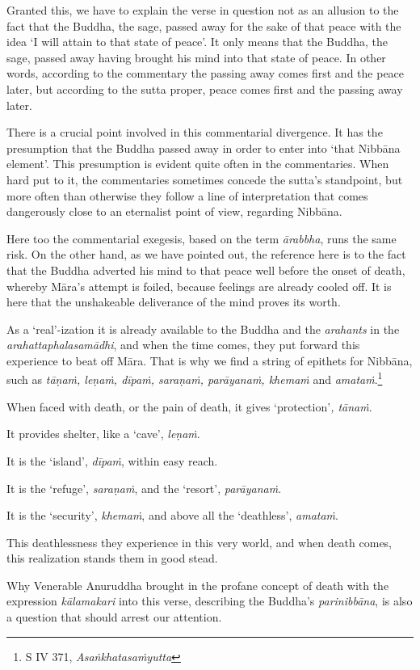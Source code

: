Granted this, we have to explain the verse in question not as an allusion to the fact that the Buddha, the sage, passed away for the sake of that peace with the idea `I will attain to that state of peace'. It only means that the Buddha, the sage, passed away having brought his mind into that state of peace. In other words, according to the commentary the passing away comes first and the peace later, but according to the sutta proper, peace comes first and the passing away later.

There is a crucial point involved in this commentarial divergence. It has the presumption that the Buddha passed away in order to enter into `that Nibbāna element'. This presumption is evident quite often in the commentaries. When hard put to it, the commentaries sometimes concede the sutta's standpoint, but more often than otherwise they follow a line of interpretation that comes dangerously close to an eternalist point of view, regarding Nibbāna.

Here too the commentarial exegesis, based on the term \emph{ārabbha}, runs the same risk. On the other hand, as we have pointed out, the reference here is to the fact that the Buddha adverted his mind to that peace well before the onset of death, whereby Māra's attempt is foiled, because feelings are already cooled off. It is here that the unshakeable deliverance of the mind proves its worth.

As a `real'-ization it is already available to the Buddha and the \emph{arahants} in the \emph{arahattaphalasamādhi}, and when the time comes, they put forward this experience to beat off Māra. That is why we find a string of epithets for Nibbāna, such as \emph{tāṇaṁ, leṇaṁ, dīpaṁ, saraṇaṁ, parāyanaṁ, khemaṁ} and \emph{amataṁ}.\footnote{S IV 371, \emph{Asaṅkhatasaṁyutta}}

When faced with death, or the pain of death, it gives `protection'\emph{, tānaṁ}.

It provides shelter, like a `cave', \emph{leṇaṁ}.

It is the `island', \emph{dīpaṁ}, within easy reach.

It is the `refuge', \emph{saraṇaṁ}, and the `resort', \emph{parāyanaṁ}.

It is the `security', \emph{khemaṁ}, and above all the `deathless', \emph{amataṁ}.

This deathlessness they experience in this very world, and when death comes, this realization stands them in good stead.

Why Venerable Anuruddha brought in the profane concept of death with the expression \emph{kālamakari} into this verse, describing the Buddha's \emph{parinibbāna}, is also a question that should arrest our attention.

